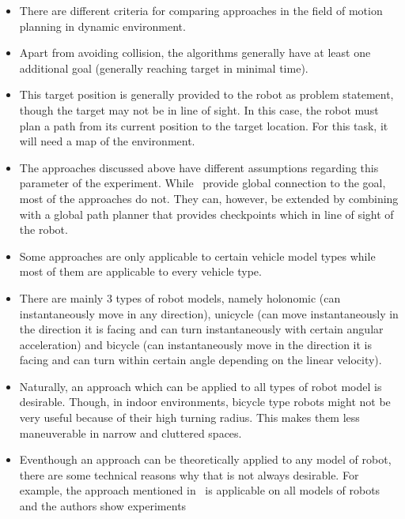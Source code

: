 \begin{itemize}
    \item There are different criteria for comparing approaches in the field of motion planning  
        in dynamic environment.
    \item Apart from avoiding collision, the algorithms generally have at least one additional goal 
        (generally reaching target in minimal time).
    \item This target position is generally provided to the robot as problem statement, though the 
        target may not be in line of sight. In this case, the robot must plan a path from its current 
        position to the target location. For this task, it will need a map of the environment. 
    \item The approaches discussed above have different assumptions regarding this parameter of 
        the experiment. While~\cite{brock1999high, ogren2005convergent, seder2007dynamic,
        chung2009safe,petti2005safe,hsu2002randomized,van2006anytime,ge2002dynamic} provide global 
        connection to the goal, most of the approaches do not.  They can, however, be extended by 
        combining with a global path planner that provides checkpoints which in line of sight of the robot.
    \item Some approaches are only applicable to certain vehicle model types while most of them are 
        applicable to every vehicle type.
    \item There are mainly 3 types of robot models, namely holonomic (can instantaneously move in 
        any direction), unicycle (can move instantaneously in the direction it is facing and can 
        turn instantaneously with certain angular acceleration) and bicycle (can instantaneously 
        move in the direction it is facing and can turn within certain angle depending on the linear 
        velocity)\cite{hoy2015algorithms}.
    \item Naturally, an approach which can be applied to all types of robot model is desirable. 
        Though, in indoor environments, bicycle type robots might not be very useful because of 
        their high turning radius. This makes them less maneuverable in narrow and cluttered spaces.
    \item Eventhough an approach can be theoretically applied to any model of robot, there are some
        technical reasons why that is not always desirable. For example, the approach mentioned 
        in~\cite{mercy2017spline} is applicable on all models of robots and the authors show experiments

\end{itemize}
